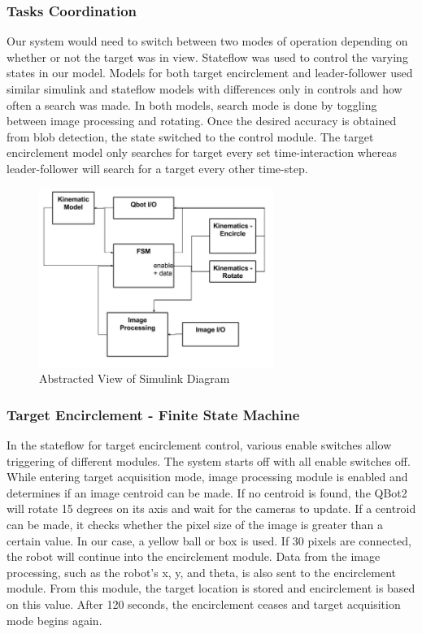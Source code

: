 \documentclass[conference]{IEEEtran}
\begin{document}
\subsubsection{Tasks Coordination}
Our system would need to switch between two modes of operation depending on whether or not the target was in view.   Stateflow was used to control the varying states in our model. Models for both target encirclement and leader-follower used similar simulink and stateflow models with differences only in controls and how often a search was made. In both models, search mode is done by toggling between image processing and rotating. Once the desired accuracy is obtained from blob detection, the state switched to the control module.  The target encirclement model only searches for target every set time-interaction whereas leader-follower will search for a target every other time-step. 

\begin{figure}[htbp]
\begin{center}
\includegraphics[width=3in]{8}
\caption{Abstracted View of Simulink Diagram} \label{fig:8}
\end{center}
\end{figure}

\subsubsection{Target Encirclement - Finite State Machine}
In the stateflow for target encirclement control, various enable switches allow triggering of different modules. The system starts off with all enable switches off. While entering target acquisition mode, image processing module is enabled and determines if an image centroid can be made. If no centroid is found, the QBot2 will rotate 15 degrees on its axis and wait for the cameras to update. If a centroid can be made, it checks whether the pixel size of the image is greater than a certain value. In our case, a yellow ball or box is used. If 30 pixels are connected, the robot will continue into the encirclement module. Data from the image processing, such as the robot’s x, y, and theta, is also sent to the encirclement module. From this module, the target location is stored and encirclement is based on this value. After 120 seconds, the encirclement ceases and target acquisition mode begins again. 
\end{document}

